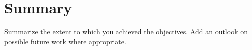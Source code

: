 \chapter{Summary}
\label{chap:summary}

Summarize the extent to which you achieved the objectives. Add an outlook on possible future work where appropriate.
